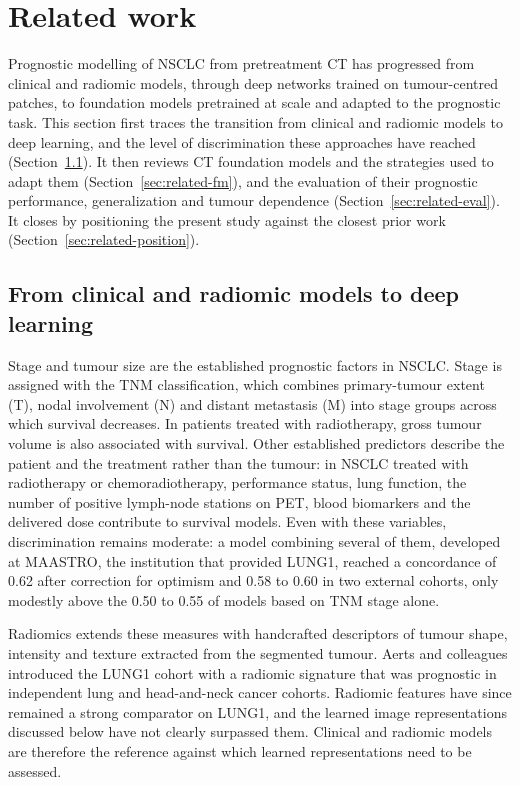 \section{Related work}\label{sec:related}
Prognostic modelling of NSCLC from pretreatment CT has progressed from clinical and radiomic models, through deep networks trained on tumour-centred patches, to foundation models pretrained at scale and adapted to the prognostic task. This section first traces the transition from clinical and radiomic models to deep learning, and the level of discrimination these approaches have reached (Section~\ref{sec:related-repr}). It then reviews CT foundation models and the strategies used to adapt them (Section~\ref{sec:related-fm}), and the evaluation of their prognostic performance, generalization and tumour dependence (Section~\ref{sec:related-eval}). It closes by positioning the present study against the closest prior work (Section~\ref{sec:related-position}).

\subsection{From clinical and radiomic models to deep learning}\label{sec:related-repr}
Stage and tumour size are the established prognostic factors in NSCLC. Stage is assigned with the TNM classification, which combines primary-tumour extent (T), nodal involvement (N) and distant metastasis (M) into stage groups across which survival decreases.\cite{goldstraw2016} In patients treated with radiotherapy, gross tumour volume is also associated with survival.\cite{bradley2002} Other established predictors describe the patient and the treatment rather than the tumour: in NSCLC treated with radiotherapy or chemoradiotherapy, performance status, lung function, the number of positive lymph-node stations on PET, blood biomarkers and the delivered dose contribute to survival models.\cite{dehingoberije2009,dehingoberije2010,oberije2015} Even with these variables, discrimination remains moderate: a model combining several of them, developed at MAASTRO, the institution that provided LUNG1, reached a concordance of 0.62 after correction for optimism and 0.58 to 0.60 in two external cohorts, only modestly above the 0.50 to 0.55 of models based on TNM stage alone.\cite{oberije2015} 

Radiomics extends these measures with handcrafted descriptors of tumour shape, intensity and texture extracted from the segmented tumour. Aerts and colleagues introduced the LUNG1 cohort with a radiomic signature that was prognostic in independent lung and head-and-neck cancer cohorts.\cite{aerts2014} Radiomic features have since remained a strong comparator on LUNG1, and the learned image representations discussed below have not clearly surpassed them.\cite{braghetto2022,neukirch2026} Clinical and radiomic models are therefore the reference against which learned representations need to be assessed.


